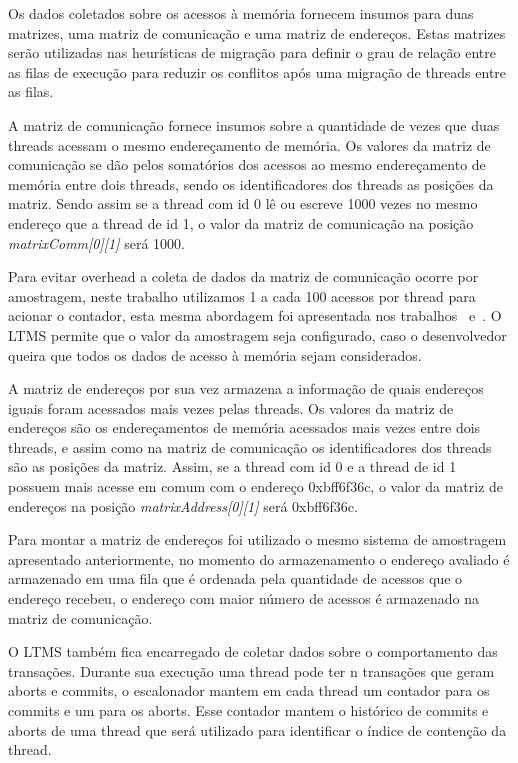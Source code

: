 \documentclass[diss,capa]{texufpel}
\begin{document}
Os dados coletados sobre os acessos à memória fornecem insumos para duas matrizes, uma matriz de comunicação e uma matriz de endereços. Estas matrizes serão utilizadas nas heurísticas de migração para definir o grau de relação entre as filas de execução para reduzir os conflitos após uma migração de threads entre as filas.

A matriz de comunicação fornece insumos sobre a quantidade de vezes que duas threads acessam o mesmo endereçamento de memória. Os valores da matriz de comunicação se dão pelos somatórios dos acessos ao mesmo endereçamento de memória entre dois threads, sendo os identificadores dos threads as posições da matriz. Sendo assim se a thread com id 0 lê ou escreve 1000 vezes no mesmo endereço que a thread de id 1, o valor da matriz de comunicação na posição \emph{matrixComm[0][1]} será 1000.

Para evitar overhead a coleta de dados da matriz de comunicação ocorre por amostragem, neste trabalho utilizamos 1 a cada 100 acessos por thread para acionar o contador, esta mesma abordagem foi apresentada nos trabalhos~\cite{pasqualin2020online} e~\cite{pasqualin2020thread}. O LTMS permite que o valor da amostragem seja configurado, caso o desenvolvedor queira que todos os dados de acesso à memória sejam considerados.

A matriz de endereços por sua vez armazena a informação de quais endereços iguais foram acessados mais vezes pelas threads. Os valores da matriz de endereços são os endereçamentos de memória acessados mais vezes entre dois threads, e assim como na matriz de comunicação os identificadores dos threads são as posições da matriz. Assim, se a thread com id 0 e a thread de id 1 possuem mais acesse em comum com o endereço 0xbff6f36c, o valor da matriz de endereços na posição \emph{matrixAddress[0][1]} será 0xbff6f36c.

Para montar a matriz de endereços foi utilizado o mesmo sistema de amostragem apresentado anteriormente, no momento do armazenamento o endereço avaliado é armazenado em uma fila que é ordenada pela quantidade de acessos que o endereço recebeu, o endereço com maior número de acessos é armazenado na matriz de comunicação.

O LTMS também fica encarregado de coletar dados sobre o comportamento das transações. Durante sua execução uma thread pode ter n transações que geram aborts e commits, o escalonador mantem em cada thread um contador para os commits e um para os aborts. Esse contador mantem o histórico de commits e aborts de uma thread que será utilizado para identificar o índice de contenção da thread. 
\end{document}
